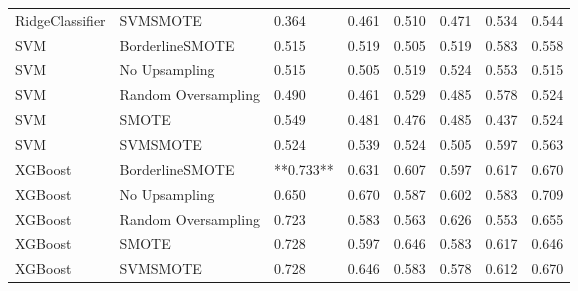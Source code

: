\begin{tabular}{llllllll}
             RidgeClassifier &            SVMSMOTE &     0.364 &                     0.461 &                 0.510 &                  0.471 &                                   0.534 &     0.544 \\
                         SVM &     BorderlineSMOTE &     0.515 &                     0.519 &                 0.505 &                  0.519 &                                   0.583 &     0.558 \\
                         SVM &       No Upsampling &     0.515 &                     0.505 &                 0.519 &                  0.524 &                                   0.553 &     0.515 \\
                         SVM & Random Oversampling &     0.490 &                     0.461 &                 0.529 &                  0.485 &                                   0.578 &     0.524 \\
                         SVM &               SMOTE &     0.549 &                     0.481 &                 0.476 &                  0.485 &                                   0.437 &     0.524 \\
                         SVM &            SVMSMOTE &     0.524 &                     0.539 &                 0.524 &                  0.505 &                                   0.597 &     0.563 \\
                     XGBoost &     BorderlineSMOTE & **0.733** &                     0.631 &                 0.607 &                  0.597 &                                   0.617 &     0.670 \\
                     XGBoost &       No Upsampling &     0.650 &                     0.670 &                 0.587 &                  0.602 &                                   0.583 &     0.709 \\
                     XGBoost & Random Oversampling &     0.723 &                     0.583 &                 0.563 &                  0.626 &                                   0.553 &     0.655 \\
                     XGBoost &               SMOTE &     0.728 &                     0.597 &                 0.646 &                  0.583 &                                   0.617 &     0.646 \\
                     XGBoost &            SVMSMOTE &     0.728 &                     0.646 &                 0.583 &                  0.578 &                                   0.612 &     0.670 \\
\bottomrule
\end{tabular}
